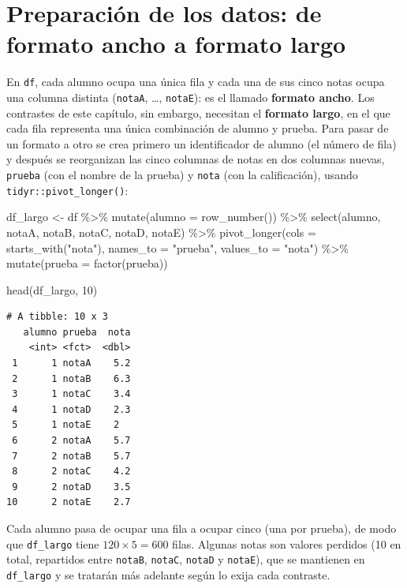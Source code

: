 \documentclass[
  spanish,
  a4paper,
]{scrreport}
\newenvironment{Shaded}{\begin{snugshade}}{\end{snugshade}}
\newcommand{\AttributeTok}[1]{\textcolor[rgb]{0.40,0.45,0.13}{#1}}
\newcommand{\DecValTok}[1]{\textcolor[rgb]{0.68,0.00,0.00}{#1}}
\newcommand{\FunctionTok}[1]{\textcolor[rgb]{0.28,0.35,0.67}{#1}}
\newcommand{\NormalTok}[1]{\textcolor[rgb]{0.00,0.23,0.31}{#1}}
\newcommand{\OtherTok}[1]{\textcolor[rgb]{0.00,0.23,0.31}{#1}}
\newcommand{\SpecialCharTok}[1]{\textcolor[rgb]{0.37,0.37,0.37}{#1}}
\newcommand{\StringTok}[1]{\textcolor[rgb]{0.13,0.47,0.30}{#1}}
\theoremstyle{definition}
\theoremstyle{definition}
\theoremstyle{remark}
\begin{document}
\section{Preparación de los datos: de formato ancho a formato
largo}\label{preparaciuxf3n-de-los-datos-de-formato-ancho-a-formato-largo}

En \texttt{df}, cada alumno ocupa una única fila y cada una de sus cinco
notas ocupa una columna distinta (\texttt{notaA}, \ldots,
\texttt{notaE}): es el llamado \textbf{formato ancho}. Los contrastes de
este capítulo, sin embargo, necesitan el \textbf{formato largo}, en el
que cada fila representa una única combinación de alumno y prueba. Para
pasar de un formato a otro se crea primero un identificador de alumno
(el número de fila) y después se reorganizan las cinco columnas de notas
en dos columnas nuevas, \texttt{prueba} (con el nombre de la prueba) y
\texttt{nota} (con la calificación), usando
\texttt{tidyr::pivot\_longer()}:

\begin{Shaded}
\begin{Highlighting}[]
\NormalTok{df\_largo }\OtherTok{\textless{}{-}}\NormalTok{ df }\SpecialCharTok{\%\textgreater{}\%}
  \FunctionTok{mutate}\NormalTok{(}\AttributeTok{alumno =} \FunctionTok{row\_number}\NormalTok{()) }\SpecialCharTok{\%\textgreater{}\%}
  \FunctionTok{select}\NormalTok{(alumno, notaA, notaB, notaC, notaD, notaE) }\SpecialCharTok{\%\textgreater{}\%}
  \FunctionTok{pivot\_longer}\NormalTok{(}\AttributeTok{cols =} \FunctionTok{starts\_with}\NormalTok{(}\StringTok{"nota"}\NormalTok{), }\AttributeTok{names\_to =} \StringTok{"prueba"}\NormalTok{, }\AttributeTok{values\_to =} \StringTok{"nota"}\NormalTok{) }\SpecialCharTok{\%\textgreater{}\%}
  \FunctionTok{mutate}\NormalTok{(}\AttributeTok{prueba =} \FunctionTok{factor}\NormalTok{(prueba))}

\FunctionTok{head}\NormalTok{(df\_largo, }\DecValTok{10}\NormalTok{)}
\end{Highlighting}
\end{Shaded}

\begin{verbatim}
# A tibble: 10 x 3
   alumno prueba  nota
    <int> <fct>  <dbl>
 1      1 notaA    5.2
 2      1 notaB    6.3
 3      1 notaC    3.4
 4      1 notaD    2.3
 5      1 notaE    2  
 6      2 notaA    5.7
 7      2 notaB    5.7
 8      2 notaC    4.2
 9      2 notaD    3.5
10      2 notaE    2.7
\end{verbatim}

Cada alumno pasa de ocupar una fila a ocupar cinco (una por prueba), de
modo que \texttt{df\_largo} tiene \(120 \times 5 = 600\) filas. Algunas
notas son valores perdidos (10 en total, repartidos entre
\texttt{notaB}, \texttt{notaC}, \texttt{notaD} y \texttt{notaE}), que se
mantienen en \texttt{df\_largo} y se tratarán más adelante según lo
exija cada contraste.
\end{document}
